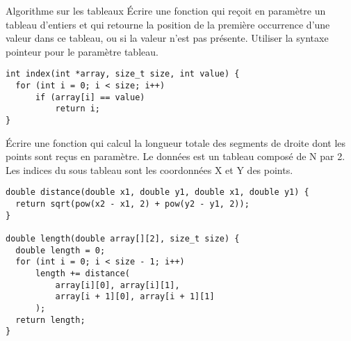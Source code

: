 \documentclass[french,a4paper,addpoints,11pt]{exam}
\begin{document}
\begin{questions}
\question Algorithme sur les tableaux 
Écrire une fonction qui reçoit en paramètre un tableau d'entiers et qui retourne la position de la première occurrence d'une valeur dans ce tableau, ou  si la valeur n'est pas présente. Utiliser la syntaxe pointeur pour le paramètre tableau. 

\ifprintanswers
\begin{solution}
\begin{lstlisting}
int index(int *array, size_t size, int value) {
  for (int i = 0; i < size; i++)
      if (array[i] == value)
          return i;
}
\end{lstlisting}
\end{solution}
\else
\fillwithdottedlines{5cm}
\fi

\question 
Écrire une fonction qui calcul la longueur totale des segments de droite dont les points sont reçus en paramètre. Le données est un tableau composé de N par 2. Les indices du sous tableau sont les coordonnées X et Y des points. 

\ifprintanswers
\begin{solution}
\begin{lstlisting}
double distance(double x1, double y1, double x1, double y1) {
  return sqrt(pow(x2 - x1, 2) + pow(y2 - y1, 2));
}

double length(double array[][2], size_t size) {
  double length = 0;
  for (int i = 0; i < size - 1; i++)
      length += distance(
          array[i][0], array[i][1], 
          array[i + 1][0], array[i + 1][1]
      );
  return length;
}
\end{lstlisting}
\end{solution}
\else
\fillwithdottedlines{7cm}
\fi

\end{questions}
\end{document}
